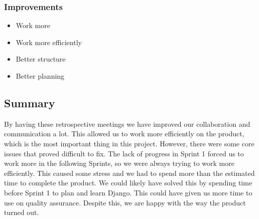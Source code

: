 \subsubsection{Improvements}
\begin{itemize}
    \item Work more
    \item Work more efficiently
    \item Better structure
    \item Better planning
\end{itemize}

\subsection{Summary}
By having these retrospective meetings we have improved our collaboration and communication a lot. This allowed us to work more efficiently on the product, which is the most important thing in this project. However, there were some core issues that proved difficult to fix. The lack of progress in Sprint 1 forced us to work more in the following Sprints, so we were always trying to work more efficiently. This caused some stress and we had to spend more than the estimated time to complete the product. We could likely have solved this by spending time before Sprint 1 to plan and learn Django. This could have given us more time to use on quality assurance. Despite this, we are happy with the way the product turned out.